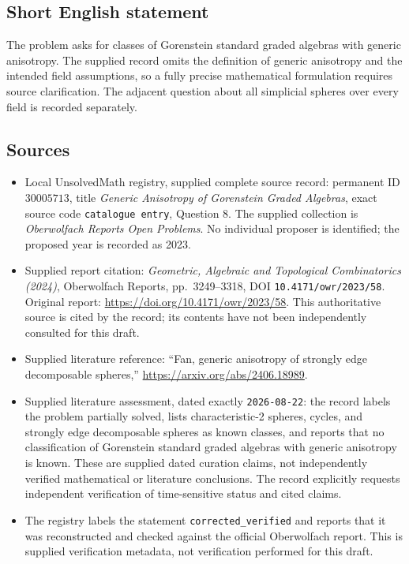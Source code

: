 \documentclass[11pt]{article}
\begin{document}
\subsection{Short English statement}
The problem asks for classes of Gorenstein standard graded algebras with generic anisotropy. The supplied record omits the definition of generic anisotropy and the intended field assumptions, so a fully precise mathematical formulation requires source clarification. The adjacent question about all simplicial spheres over every field is recorded separately.
\subsection{Sources}
\begin{itemize}
\item Local UnsolvedMath registry, supplied complete source record: permanent ID \(30005713\), title \emph{Generic Anisotropy of Gorenstein Graded Algebras}, exact source code \texttt{catalogue entry}, Question 8. The supplied collection is \emph{Oberwolfach Reports Open Problems}. No individual proposer is identified; the proposed year is recorded as 2023.
\item Supplied report citation: \emph{Geometric, Algebraic and Topological Combinatorics (2024)}, Oberwolfach Reports, pp.\ 3249--3318, DOI \texttt{10.4171/owr/2023/58}. Original report: \url{https://doi.org/10.4171/owr/2023/58}. This authoritative source is cited by the record; its contents have not been independently consulted for this draft.
\item Supplied literature reference: ``Fan, generic anisotropy of strongly edge decomposable spheres,'' \url{https://arxiv.org/abs/2406.18989}.
\item Supplied literature assessment, dated exactly \texttt{2026-08-22}: the record labels the problem partially solved, lists characteristic-2 spheres, cycles, and strongly edge decomposable spheres as known classes, and reports that no classification of Gorenstein standard graded algebras with generic anisotropy is known. These are supplied dated curation claims, not independently verified mathematical or literature conclusions. The record explicitly requests independent verification of time-sensitive status and cited claims.
\item The registry labels the statement \texttt{corrected\_verified} and reports that it was reconstructed and checked against the official Oberwolfach report. This is supplied verification metadata, not verification performed for this draft.
\end{itemize}
\end{document}
